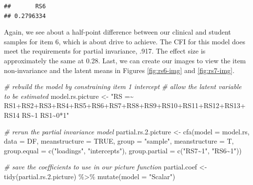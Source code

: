 \documentclass[
  man]{apa7}
\newenvironment{Shaded}{\begin{snugshade}}{\end{snugshade}}
\newcommand{\AttributeTok}[1]{\textcolor[rgb]{0.77,0.63,0.00}{#1}}
\newcommand{\CommentTok}[1]{\textcolor[rgb]{0.56,0.35,0.01}{\textit{#1}}}
\newcommand{\ConstantTok}[1]{\textcolor[rgb]{0.00,0.00,0.00}{#1}}
\newcommand{\DecValTok}[1]{\textcolor[rgb]{0.00,0.00,0.81}{#1}}
\newcommand{\FloatTok}[1]{\textcolor[rgb]{0.00,0.00,0.81}{#1}}
\newcommand{\FunctionTok}[1]{\textcolor[rgb]{0.00,0.00,0.00}{#1}}
\newcommand{\NormalTok}[1]{#1}
\newcommand{\OtherTok}[1]{\textcolor[rgb]{0.56,0.35,0.01}{#1}}
\newcommand{\SpecialCharTok}[1]{\textcolor[rgb]{0.00,0.00,0.00}{#1}}
\newcommand{\StringTok}[1]{\textcolor[rgb]{0.31,0.60,0.02}{#1}}
\begin{document}
\small

\begin{Shaded}
\end{Shaded}

\normalsize

\begin{verbatim}
##       RS6 
## 0.2796334
\end{verbatim}

Again, we see about a half-point difference between our clinical and student samples for item 6, which is about drive to achieve. The CFI for this model does meet the requirements for partial invariance, .917. The effect size is approximately the same at 0.28. Last, we can create our images to view the item non-invariance and the latent means in Figures \ref{fig:rs6-img} and \ref{fig:rs7-img}.

\small

\begin{Shaded}
\begin{Highlighting}[]
\CommentTok{\# rebuild the model by constraining item 1 intercept}
\CommentTok{\# allow the latent variable to be estimated}
\NormalTok{model.rs.picture }\OtherTok{\textless{}{-}} \StringTok{"RS =\textasciitilde{} RS1+RS2+RS3+RS4+RS5+RS6+RS7+RS8+RS9+RS10+RS11+RS12+RS13+RS14}
\StringTok{RS\textasciitilde{}1}
\StringTok{RS1\textasciitilde{}0*1"}

\CommentTok{\# rerun the partial invariance model }
\NormalTok{partial.rs.}\FloatTok{2.}\NormalTok{picture }\OtherTok{\textless{}{-}} \FunctionTok{cfa}\NormalTok{(}\AttributeTok{model =}\NormalTok{ model.rs, }
                  \AttributeTok{data =}\NormalTok{ DF, }
                  \AttributeTok{meanstructure =} \ConstantTok{TRUE}\NormalTok{,}
                  \AttributeTok{group =} \StringTok{"sample"}\NormalTok{, }
                  \AttributeTok{meanstructure =}\NormalTok{ T, }
                  \AttributeTok{group.equal =} \FunctionTok{c}\NormalTok{(}\StringTok{"loadings"}\NormalTok{, }\StringTok{"intercepts"}\NormalTok{),}
                  \AttributeTok{group.partial =} \FunctionTok{c}\NormalTok{(}\StringTok{"RS7\textasciitilde{}1"}\NormalTok{, }\StringTok{"RS6\textasciitilde{}1"}\NormalTok{))}

\CommentTok{\# save the coefficients to use in our picture function }
\NormalTok{partial.coef }\OtherTok{\textless{}{-}} \FunctionTok{tidy}\NormalTok{(partial.rs.}\FloatTok{2.}\NormalTok{picture) }\SpecialCharTok{\%\textgreater{}\%} 
  \FunctionTok{mutate}\NormalTok{(}\AttributeTok{model =} \StringTok{"Scalar"}\NormalTok{)}
\end{Highlighting}
\end{Shaded}
\end{document}
